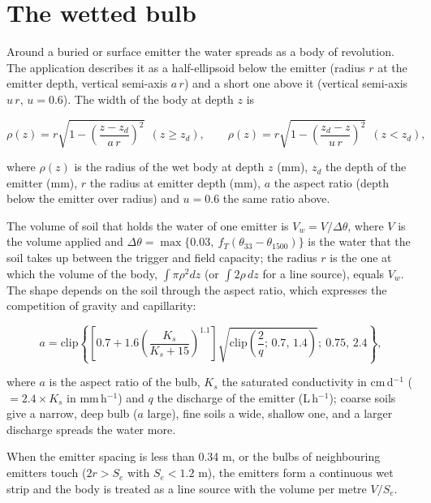 \section{The wetted bulb}
Around a buried or surface emitter the water spreads as a body of revolution. The application describes it as a half-ellipsoid below the emitter (radius $r$ at the emitter depth, vertical semi-axis $a\,r$) and a short one above it (vertical semi-axis $u\,r$, $u=0.6$). The width of the body at depth $z$ is

\begin{equation}\boxed{\rho(z)=r\sqrt{1-\left(\frac{z-z_d}{a\,r}\right)^2}\ \ (z\ge z_d),\qquad \rho(z)=r\sqrt{1-\left(\frac{z_d-z}{u\,r}\right)^2}\ \ (z<z_d),}\label{eq:d-bulb}\end{equation}
\par\noindent where $\rho(z)$ is the radius of the wet body at depth $z$ (mm), $z_d$ the depth of the emitter (mm), $r$ the radius at emitter depth (mm), $a$ the aspect ratio (depth below the emitter over radius) and $u=0.6$ the same ratio above.



The volume of soil that holds the water of one emitter is $V_w=V/\Delta\theta$, where $V$ is the volume applied and $\Delta\theta=\max\{0.03,\ f_T(\theta_{33}-\theta_{1500})\}$ is the water that the soil takes up between the trigger and field capacity; the radius $r$ is the one at which the volume of the body, $\int\pi\rho^2dz$ (or $\int2\rho\,dz$ for a line source), equals $V_w$. The shape depends on the soil through the aspect ratio, which expresses the competition of gravity and capillarity:

\begin{equation}\boxed{a=\mathrm{clip}\left\{\left[0.7+1.6\left(\frac{K_s}{K_s+15}\right)^{1.1}\right]\sqrt{\mathrm{clip}\!\left(\frac{2}{q};\,0.7,\,1.4\right)};\ 0.75,\,2.4\right\},}\label{eq:d-asp}\end{equation}
\par\noindent where $a$ is the aspect ratio of the bulb, $K_s$ the saturated conductivity in cm\,d$^{-1}$ ($=2.4\times K_s$ in mm\,h$^{-1}$) and $q$ the discharge of the emitter (L\,h$^{-1}$); coarse soils give a narrow, deep bulb ($a$ large), fine soils a wide, shallow one, and a larger discharge spreads the water more.



When the emitter spacing is less than 0.34 m, or the bulbs of neighbouring emitters touch ($2r>S_e$ with $S_e<1.2$ m), the emitters form a continuous wet strip and the body is treated as a line source with the volume per metre $V/S_e$.

